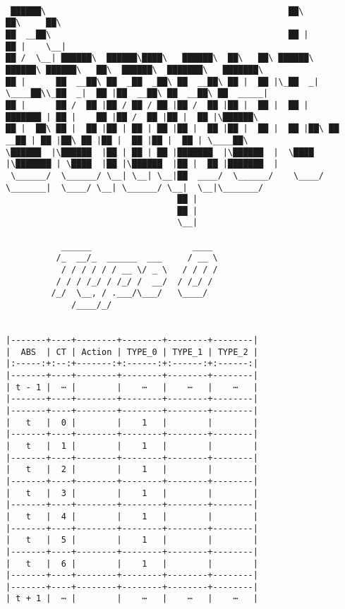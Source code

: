 \documentclass[varwidth=\maxdimen,margin=0.5cm,multi={verbatim}]{standalone}
\begin{document}
\begin{verbatim}

 ██████\                                                ██\                ██\     ██\                               
██  __██\                                               ██ |               ██ |    \__|                              
██ /  \__| ██████\  ██████\████\   ██████\  ██\   ██\ ██████\    ██████\ ██████\   ██\  ██████\  ███████\   ███████\ 
██ |      ██  __██\ ██  _██  _██\ ██  __██\ ██ |  ██ |\_██  _|   \____██\\_██  _|  ██ |██  __██\ ██  __██\ ██  _____|
██ |      ██ /  ██ |██ / ██ / ██ |██ /  ██ |██ |  ██ |  ██ |     ███████ | ██ |    ██ |██ /  ██ |██ |  ██ |\██████\  
██ |  ██\ ██ |  ██ |██ | ██ | ██ |██ |  ██ |██ |  ██ |  ██ |██\ ██  __██ | ██ |██\ ██ |██ |  ██ |██ |  ██ | \____██\ 
\██████  |\██████  |██ | ██ | ██ |███████  |\██████  |  \████  |\███████ | \████  |██ |\██████  |██ |  ██ |███████  |
 \______/  \______/ \__| \__| \__|██  ____/  \______/    \____/  \_______|  \____/ \__| \______/ \__|  \__|\_______/ 
                                  ██ |                                                                               
                                  ██ |                                                                               
                                  \__|

           ______                    ____                                                                            
          /_  __/_  ______  ___     / __ \
           / / / / / / __ \/ _ \   / / / /
          / / / /_/ / /_/ /  __/  / /_/ / 
         /_/  \__, / .___/\___/   \____/  
             /____/_/


|-------+----+--------+--------+--------+--------|
|  ABS  | CT | Action | TYPE_0 | TYPE_1 | TYPE_2 |
|:-----:+:--:+-------:+:------:+:------:+:------:|
|-------+----+--------+--------+--------+--------|
| t - 1 |  ⋯ |        |    ⋯   |    ⋯   |    ⋯   |
|-------+----+--------+--------+--------+--------|
|-------+----+--------+--------+--------+--------|
|   t   |  0 |        |    1   |        |        |
|-------+----+--------+--------+--------+--------|
|   t   |  1 |        |    1   |        |        |
|-------+----+--------+--------+--------+--------|
|   t   |  2 |        |    1   |        |        |
|-------+----+--------+--------+--------+--------|
|   t   |  3 |        |    1   |        |        |
|-------+----+--------+--------+--------+--------|
|   t   |  4 |        |    1   |        |        |
|-------+----+--------+--------+--------+--------|
|   t   |  5 |        |    1   |        |        |
|-------+----+--------+--------+--------+--------|
|   t   |  6 |        |    1   |        |        |
|-------+----+--------+--------+--------+--------|
|-------+----+--------+--------+--------+--------|
| t + 1 |  ⋯ |        |    ⋯   |    ⋯   |    ⋯   |




\end{verbatim}
\end{document}
